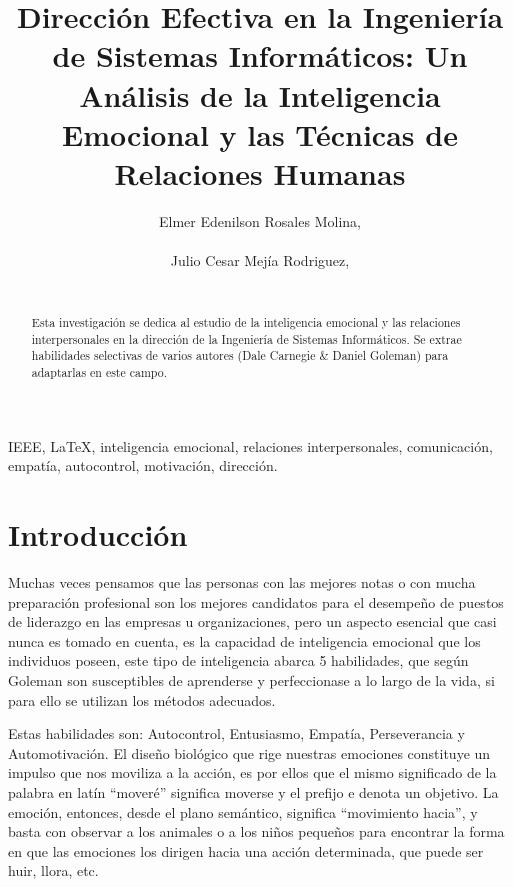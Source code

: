 \documentclass[journal]{IEEEtran}
\begin{document}
\title{Dirección Efectiva en la Ingeniería de Sistemas Informáticos: Un Análisis de la Inteligencia Emocional y las Técnicas de Relaciones Humanas}

\author{Elmer Edenilson Rosales Molina,\\ ~\\
        Julio Cesar Mejía Rodriguez,\\ ~}

\maketitle

\begin{abstract}
Esta investigación se dedica al estudio de la inteligencia emocional y las relaciones interpersonales en la dirección de la Ingeniería de Sistemas Informáticos. Se extrae habilidades selectivas de varios autores (Dale Carnegie \& Daniel Goleman) para adaptarlas en este campo. 
\end{abstract}

\begin{keywords}
IEEE, \LaTeX, inteligencia emocional, relaciones interpersonales, comunicación, empatía, autocontrol, motivación, dirección.
\end{keywords}

\IEEEpeerreviewmaketitle

\section{Introducción}
Muchas veces pensamos que las personas con las mejores notas o con mucha preparación profesional son los mejores candidatos para el desempeño de puestos de liderazgo en las empresas u organizaciones, pero un aspecto esencial que casi nunca es tomado en cuenta, es la capacidad de inteligencia emocional que los individuos poseen, este tipo de inteligencia abarca 5 habilidades, que según Goleman son susceptibles de aprenderse y perfeccionase a lo largo de la vida, si para ello se utilizan los métodos adecuados.

Estas habilidades son: Autocontrol, Entusiasmo, Empatía, Perseverancia y Automotivación. El diseño biológico que rige nuestras emociones constituye un impulso que nos moviliza a la acción, es por ellos que el mismo significado de la palabra en latín “moveré” significa moverse y el prefijo e denota un objetivo. La emoción, entonces, desde el plano semántico, significa “movimiento hacia”, y basta con observar a los animales o a los niños pequeños para encontrar la forma en que las emociones los dirigen hacia una acción determinada, que puede ser huir, llora, etc.
\end{document}
